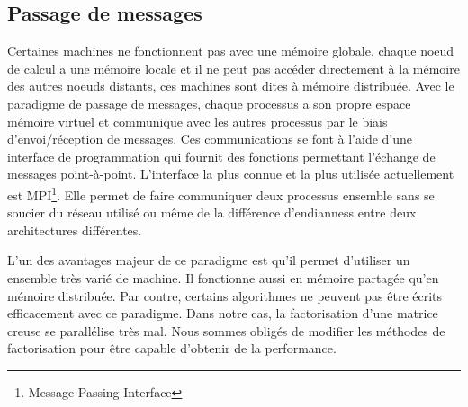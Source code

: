 \subsection{Passage de messages}
Certaines machines ne fonctionnent pas avec une mémoire globale, chaque noeud de calcul a une mémoire locale et il ne peut pas accéder directement à la mémoire des autres noeuds distants, ces machines sont dites à mémoire distribuée.
%
Avec le paradigme de passage de messages, chaque processus a son propre espace mémoire virtuel et communique avec les autres processus par le biais d'envoi/réception de messages.
%
Ces communications se font à l'aide d'une interface de programmation qui fournit des fonctions permettant l'échange de messages point-à-point.
%
L'interface la plus connue et la plus utilisée actuellement est MPI\footnote{Message Passing Interface}.
%
Elle permet de faire communiquer deux processus ensemble sans se soucier du réseau utilisé ou même de la différence d'endianness entre deux architectures différentes.


L'un des avantages majeur de ce paradigme est qu'il permet d'utiliser un ensemble très varié de machine.
%
Il fonctionne aussi en mémoire partagée qu'en mémoire distribuée.
%
Par contre, certains algorithmes ne peuvent pas être écrits efficacement avec ce paradigme.
%
Dans notre cas, la factorisation d'une matrice creuse se parallélise très mal.
%
Nous sommes obligés de modifier les méthodes de factorisation pour être capable d'obtenir de la performance.
